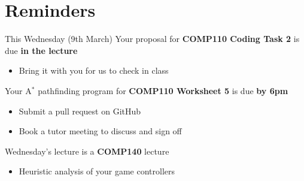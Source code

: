 \part{Reminders}
\frame{\partpage}

\begin{frame}{This Wednesday (9th March)}
    Your proposal for \textbf{COMP110 Coding Task 2} is due \textbf{in the lecture}
    \begin{itemize}
        \item Bring it with you for us to check in class
    \end{itemize} \pause
    Your A$^*$ pathfinding program for \textbf{COMP110 Worksheet 5} is due \textbf{by 6pm}
    \begin{itemize}
        \item Submit a pull request on GitHub
        \item Book a tutor meeting to discuss and sign off
    \end{itemize} \pause
    Wednesday's lecture is a \textbf{COMP140} lecture
    \begin{itemize}
        \item Heuristic analysis of your game controllers
    \end{itemize}
\end{frame}
